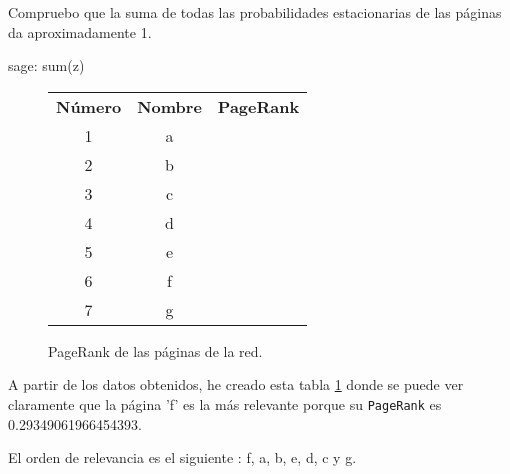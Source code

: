 \par Compruebo que la suma de todas las probabilidades estacionarias de las páginas da aproximadamente 1.
\begin{sagecommandline}
    sage: sum(z)
\end{sagecommandline}

\begin{figure}[H]
    \centering
    \begin{tabular}{|c|c|c|}
        \hline
        \rowcolor{azul} \multicolumn{2}{|c|}{\textbf{Página}}& \\ \hline
        \rowcolor{azul} \textbf{Número} & \textbf{Nombre} & \textbf{PageRank} \\ \hline
        1 & a & \cellcolor{blue!25}{0.221980001405918} \\ \hline
        2 & b & \cellcolor{blue!25}{0.15271641500884678}  \\ \hline
        3 & c & \cellcolor{yellow!25}{0.07125255257058884}  \\ \hline
        4 & d & \cellcolor{yellow!25}{0.08425917197181364} \\ \hline
        5 & e & \cellcolor{blue!25}{0.12232440224893072}  \\ \hline
        6 & f & \cellcolor{green!25}{0.29349061966454393} \\ \hline
        7 & g & \cellcolor{red!25}{0.05397683712931336} \\ \hline
    \end{tabular}
	\caption{PageRank de las páginas de la red.}
    \label{fig:pageRankPaginas}
\end{figure}
\par A partir de los datos obtenidos, he creado esta tabla \ref{fig:pageRankPaginas} donde se puede ver claramente que 
la página 'f' es la más relevante porque su \texttt{PageRank} es 0.29349061966454393.
\par El orden de relevancia es el siguiente : f, a, b, e, d, c y g.